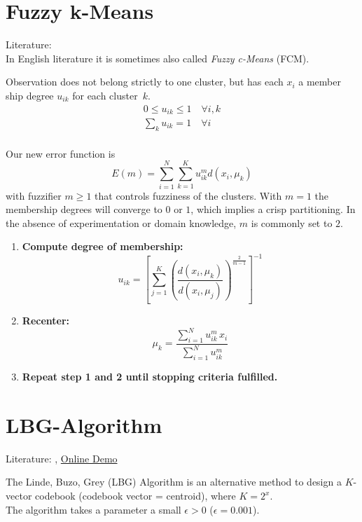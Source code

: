 \section{Fuzzy k-Means}\label{sec:fuzzy-kmeans}
Literature: \cite{Introduction2000}\\
In English literature it is sometimes also called \emph{Fuzzy c-Means} (FCM).

Observation does not belong strictly to one cluster, but has each $x_i$ a member ship degree $u_{ik}$ for each cluster~$k$.
\begin{align}
0 \leq u_{ik} \leq 1 \quad \forall i, k\\
\sum_k u_{ik} = 1 \quad \forall i\\
\end{align}

Our new error function is
\begin{equation}\label{eq:fuzzy-kmeans-error}
E(m) = \sum_{i=1}^N \sum_{k=1}^K u_{ik}^m d(x_i, \mu_k)
\end{equation}
with fuzzifier $m \geq 1$ that controls fuzziness of the clusters. With $m=1$ the membership degrees will converge to $0$ or $1$, which implies a crisp partitioning. In the absence of experimentation or domain knowledge, $m$ is commonly set to $2$.

\begin{enumerate}
\item \textbf{Compute degree of membership:}
	$$u_{ik} = \left[ \sum_{j=1}^K \left( \frac{d(x_i, \mu_k)}{d(x_i, \mu_j)} \right)^{\frac{2}{m-1}} \right]^{-1}$$
\item \textbf{Recenter:}
	$$\mu_k = \frac{\sum_{i=1}^N u_{ik}^m \, x_i}{\sum_{i=1}^N u_{ik}^m}$$
\item \textbf{Repeat step 1 and 2 until stopping criteria fulfilled.}
\end{enumerate}

\section{LBG-Algorithm}
Literature: \cite{Linde1980}, \href{http://www.data-compression.com/vqanim.shtml}{Online Demo}

The Linde, Buzo, Grey (LBG) Algorithm is an alternative method to design a $K$-vector codebook (codebook vector = centroid), where $K=2^x$.\\
The algorithm takes a parameter a small $\epsilon > 0$ (\eg $\epsilon=0.001$).

